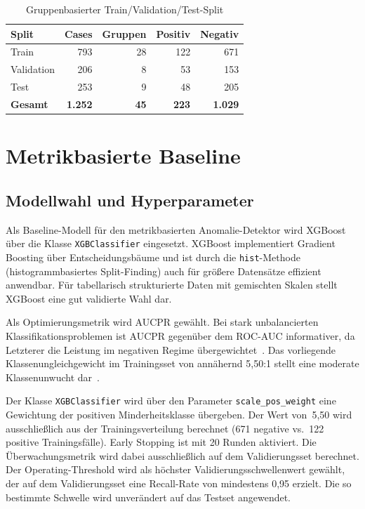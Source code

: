 \begin{table}[H]
  \centering
  \caption{Gruppenbasierter Train/Validation/Test-Split}
  \label{tab:split}
  \begin{tabular}{lrrrr}
    \hline
    \textbf{Split} & \textbf{Cases} & \textbf{Gruppen} & \textbf{Positiv} & \textbf{Negativ} \\
    \hline
    Train      & 793 & 28 & 122 & 671 \\
    Validation & 206 &  8 &  53 & 153 \\
    Test       & 253 &  9 &  48 & 205 \\
    \hline
    \textbf{Gesamt} & \textbf{1.252} & \textbf{45} & \textbf{223} & \textbf{1.029} \\
    \hline
  \end{tabular}
\end{table}

\section{Metrikbasierte Baseline}

\subsection{Modellwahl und Hyperparameter}

Als Baseline-Modell für den metrikbasierten Anomalie-Detektor wird XGBoost~\cite{chen2016xgboost} über die Klasse \texttt{XGBClassifier} eingesetzt. XGBoost implementiert Gradient Boosting über Entscheidungsbäume und ist durch die \texttt{hist}-Methode (histogrammbasiertes Split-Finding) auch für größere Datensätze effizient anwendbar. Für tabellarisch strukturierte Daten mit gemischten Skalen stellt XGBoost eine gut validierte Wahl dar.

Als Optimierungsmetrik wird AUCPR gewählt. Bei stark unbalancierten Klassifikations\-problemen ist AUCPR gegenüber dem ROC-AUC informativer, da Letzterer die Leistung im negativen Regime übergewichtet~\cite{davis2006relationship,saito2015precision}. Das vorliegende Klassenungleichgewicht im Trainingsset von annähernd 5{,}50:1 stellt eine moderate Klassenunwucht dar~\cite{hegarcia2009learning}.

Der Klasse \texttt{XGBClassifier} wird über den Parameter \texttt{scale\_pos\_weight} eine Gewichtung der positiven Minderheitsklasse übergeben. Der Wert von~5{,}50 wird ausschließlich aus der Trainingsverteilung berechnet (671 negative vs.\ 122 positive Trainingsfälle). Early Stopping ist mit 20 Runden aktiviert. Die Überwachungsmetrik wird dabei ausschließlich auf dem Validierungsset berechnet. Der Operating-Threshold wird als höchster Validierungsschwellenwert gewählt, der auf dem Validierungsset eine Recall-Rate von mindestens 0{,}95 erzielt. Die so bestimmte Schwelle wird unverändert auf das Testset angewendet.

